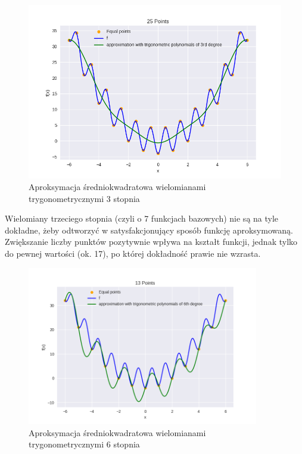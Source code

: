 \documentclass{article}
\begin{document}
\begin{figure}[H]
    \centering
    \includegraphics[width=\textwidth]{img/tripoly_3_25.png}
    \caption{Aproksymacja średniokwadratowa wielomianami trygonometrycznymi 3 stopnia}
\end{figure}

Wielomiany trzeciego stopnia (czyli o 7 funkcjach bazowych) nie są na tyle dokładne, żeby odtworzyć w satysfakcjonujący
sposób funkcję aproksymowaną. Zwiększanie liczby punktów pozytywnie wpływa na kształt funkcji, jednak tylko do pewnej wartości
(ok. 17), po której dokładność prawie nie wzrasta.

\begin{figure}[H]
    \centering
    \includegraphics[width=0.9\textwidth]{img/tripoly_6_13.png}
    \caption{Aproksymacja średniokwadratowa wielomianami trygonometrycznymi 6 stopnia}
\end{figure}
\end{document}
